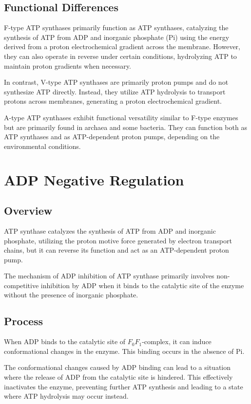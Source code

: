 \documentclass{article}
\begin{document}
\subsection{Functional Differences}

F-type ATP synthases primarily function as ATP synthases, catalyzing the synthesis of ATP from ADP and inorganic phosphate (Pi) using the energy derived from a proton electrochemical gradient across the membrane. However, they can also operate in reverse under certain conditions, hydrolyzing ATP to maintain proton gradients when necessary.

In contrast, V-type ATP synthases are primarily proton pumps and do not synthesize ATP directly. Instead, they utilize ATP hydrolysis to transport protons across membranes, generating a proton electrochemical gradient.

A-type ATP synthases exhibit functional versatility similar to F-type enzymes but are primarily found in archaea and some bacteria. They can function both as ATP synthases and as ATP-dependent proton pumps, depending on the environmental conditions.

\section{ADP Negative Regulation}

\subsection{Overview}

ATP synthase catalyzes the synthesis of ATP from ADP and inorganic phosphate, utilizing the proton motive force generated by electron transport chains, but it can reverse its function and act as an ATP-dependent proton pump.

The mechanism of ADP inhibition of ATP synthase primarily involves non-competitive inhibition by ADP when it binds to the catalytic site of the enzyme without the presence of inorganic phosphate.

\subsection{Process}

When ADP binds to the catalytic site of $F_0F_1$-complex, it can induce conformational changes in the enzyme. This binding occurs in the absence of Pi.

The conformational changes caused by ADP binding can lead to a situation where the release of ADP from the catalytic site is hindered. This effectively inactivates the enzyme, preventing further ATP synthesis and leading to a state where ATP hydrolysis may occur instead.
\end{document}
